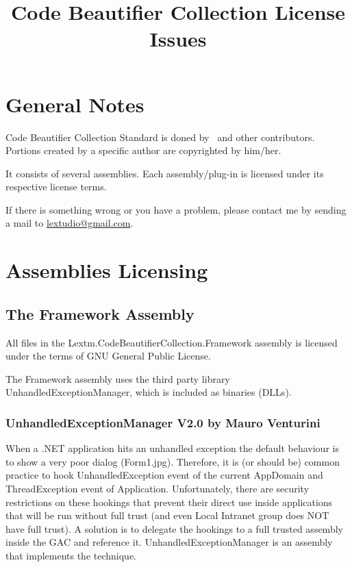 \documentclass{article}
\author{\lextm}
\title{Code Beautifier Collection License Issues}
\begin{document}
\maketitle

\copyclaimer





\section{General Notes}
Code Beautifier Collection Standard is doned by \lextm\ and other
contributors. Portions created by a specific author are copyrighted by him/her.

It consists of several assemblies. Each assembly/plug-in is licensed under its
respective license terms.

If there is something wrong or you have a problem, please contact me by sending
a mail to \underline{lextudio@gmail.com}.

\section{Assemblies Licensing}

\subsection{The Framework Assembly}

All files in the Lextm.Code\-Beautifier\-Collection.Frame\-work assembly is
licensed under the terms of GNU General Public License.

The Framework assembly uses the third party library 
UnhandledExceptionManager, which is included as binaries (DLLs).

\subsubsection{UnhandledExceptionManager V2.0 by Mauro Venturini}
When a .NET application hits an unhandled exception the default behaviour is to
show a very poor dialog (Form1.jpg). Therefore, it is (or should be) common
practice to hook UnhandledException event of the current AppDomain and
ThreadException event of Application. Unfortunately, there are security
restrictions on these hookings that prevent their direct use inside
applications that will be run without full trust (and even Local Intranet group
does NOT have full trust). A solution is to delegate the hookings to a full
trusted assembly inside the GAC and reference it. UnhandledExceptionManager is
an assembly that implements the technique.
\end{document}
